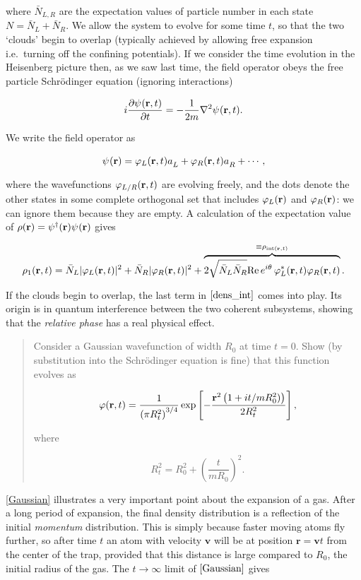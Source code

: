 where \(\bar N_{L,R}\) are the expectation values of particle number in
each state \(N=\bar N_L+\bar N_R\). We allow the system to evolve for
some time \(t\), so that the two `clouds' begin to overlap (typically
achieved by allowing free expansion i.e.~turning off the confining
potentials). If we consider the time evolution in the Heisenberg picture
then, as we saw last time, the field operator obeys the free particle
Schrödinger equation (ignoring interactions)

\[
i\frac{\partial \pop(\br,t)}{\partial t} = -\frac{1}{2m}\nabla^2\pop(\br,t).
\]

We write the field operator as

\[
\pop(\br)=\varphi_L(\br,t)\aop_L+\varphi_R(\br,t)\aop_R+\cdots,
\]

where the wavefunctions \(\varphi_{L/R}(\mathbf{r},t)\) are evolving freely,
and the dots denote the other states in some complete orthogonal set
that includes \(\varphi_L(\mathbf{r})\) and \(\varphi_R(\mathbf{r})\): we can ignore
them because they are empty. A calculation of the expectation value of
\(\rho(\br)=\pdop(\br)\pop(\br)\) gives

\[
    \begin{align}
    \rho_1(\mathbf{r},t)=\bar N_L|\varphi_L(\mathbf{r},t)|^2+\bar N_R|\varphi_R(\mathbf{r},t)|^2+\overbrace{2\sqrt{\bar N_L \bar
    N_R}\mathrm{Re}\,e^{i\theta}\,\varphi^*_L(\mathbf{r},t)\varphi_R(\mathbf{r},t)}^{\equiv\rho_{\mathrm{int}(
    \mathbf{r},t)}}.
  \label{dens_int}
    \end{align}
\]

If the clouds begin to overlap, the last term in \(\eqref{dens_int}\)
comes into play. Its origin is in quantum interference between the two
coherent subsystems, showing that the \emph{relative phase} has a real
physical effect.

\begin{quote}
Consider a Gaussian wavefunction of width \(R_0\) at time \(t=0\). Show
(by substitution into the Schrödinger equation is fine) that this
function evolves as

\[
  \varphi(\mathbf{r},t)=\frac{1}{\left(\pi R_t^{2}\right)^{3/4}}\exp\left[-\frac{\mathbf{r}^2\left(1+i t/m R_0^2)\right)}{2R_t^2}\right],
 \label{Gaussian}
\]

where

\[
R_t^2=R_0^2+\left(\frac{ t}{mR_0}\right)^2.
\]
\end{quote}

\eqref{Gaussian} illustrates a very important point about the expansion
of a gas. After a long period of expansion, the final density
distribution is a reflection of the initial \emph{momentum}
distribution. This is simply because faster moving atoms fly further, so
after time \(t\) an atom with velocity \(\mathbf{v}\) will be at
position \(\mathbf{r}=\mathbf{v}t\) from the center of the trap,
provided that this distance is large compared to \(R_{0}\), the initial
radius of the gas. The \(t\to\infty\) limit of \(\eqref{Gaussian}\)
gives

